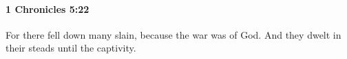 
		\paragraph{1 Chronicles 5:22} %
			\label{1CHRONICLES-5-22}

			For there fell down many slain, because the war was of God. And they dwelt in their steads until the captivity.



